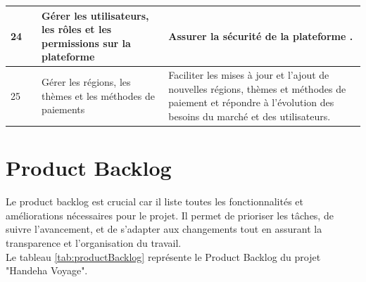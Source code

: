 \documentclass[12pt]{report}
\begin{document}
\begin{longtable}{|p{2cm}|p{4cm}|p{4cm}|p{4cm}|}
					24 &&Gérer les utilisateurs, les rôles et les permissions sur la plateforme & Assurer la sécurité de la plateforme .\\ 
					\hline
					25&& Gérer les régions, les thèmes et les méthodes de paiements &  Faciliter les mises à jour et l'ajout de nouvelles régions, thèmes et méthodes de paiement et répondre à l'évolution des besoins du marché et des utilisateurs.\\ 
					\hline
				\end{longtable}

				
				\section{Product Backlog}

				Le product backlog est crucial car il liste toutes les fonctionnalités et améliorations nécessaires pour le projet. Il permet de prioriser les tâches, de suivre l'avancement, et de s'adapter aux changements tout en assurant la transparence et l'organisation du travail.\\

				Le tableau \ref{tab:productBacklog} représente le Product Backlog du projet "Handeha Voyage".
\end{document}
